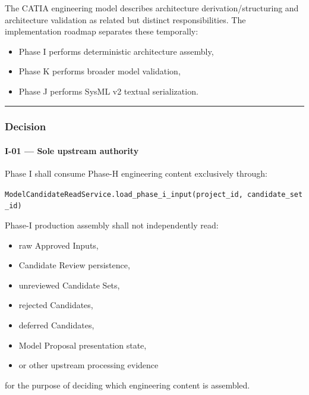 The CATIA engineering model describes architecture derivation/structuring and architecture validation as related but distinct responsibilities. The implementation roadmap separates these temporally:

\begin{itemize}
\tightlist
\item
  Phase I performs deterministic architecture assembly,
\item
  Phase K performs broader model validation,
\item
  Phase J performs SysML v2 textual serialization.
\end{itemize}

\begin{center}\rule{0.5\linewidth}{0.5pt}\end{center}

\hypertarget{decision-4}{%
\subsubsection{Decision}\label{decision-4}}

\hypertarget{i-01--sole-upstream-authority}{%
\paragraph{I-01 --- Sole upstream authority}\label{i-01--sole-upstream-authority}}

Phase I shall consume Phase-H engineering content exclusively through:

\texttt{ModelCandidateReadService.load\_phase\_i\_input(project\_id,\ candidate\_set\_id)}

Phase-I production assembly shall not independently read:

\begin{itemize}
\tightlist
\item
  raw Approved Inputs,
\item
  Candidate Review persistence,
\item
  unreviewed Candidate Sets,
\item
  rejected Candidates,
\item
  deferred Candidates,
\item
  Model Proposal presentation state,
\item
  or other upstream processing evidence
\end{itemize}

for the purpose of deciding which engineering content is assembled.

